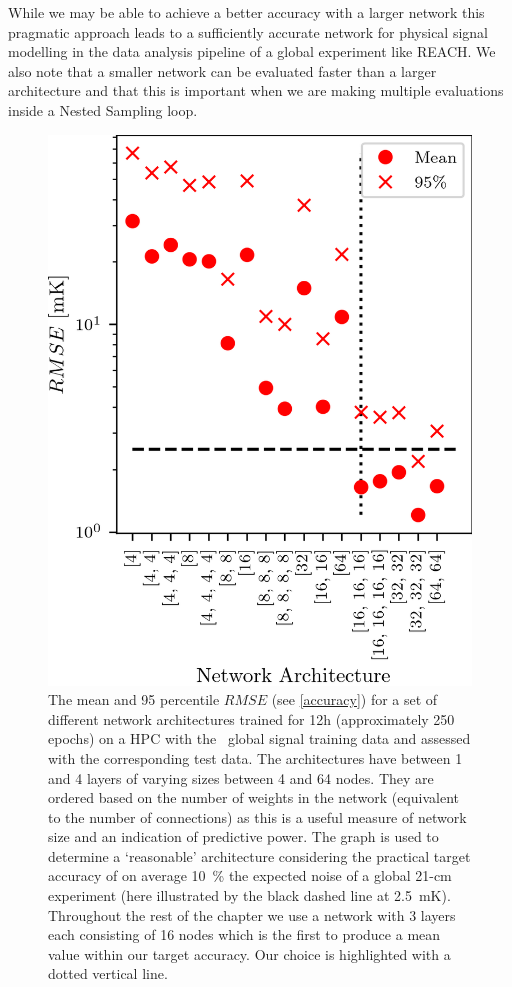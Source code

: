 While we may be able to achieve a better accuracy with a larger network this pragmatic approach leads to a sufficiently accurate network for physical signal modelling in the data analysis pipeline of a global experiment like REACH. We also note that a smaller network can be evaluated faster than a larger architecture and that this is important when we are making multiple evaluations inside a Nested Sampling loop.

\begin{figure}
    \centering
    \includegraphics{globalemu/figs/Architecture.png}
    \caption{The mean and 95 percentile $RMSE$ (see \cref{accuracy}) for a set of different network architectures trained for 12h (approximately 250 epochs) on a HPC with the \cmGEM~global signal training data and assessed with the corresponding test data. The architectures have between 1 and 4 layers of varying sizes between 4 and 64 nodes. They are ordered based on the number of weights in the network (equivalent to the number of connections) as this is a useful measure of network size and an indication of predictive power. The graph is used to determine a `reasonable' architecture considering the practical target accuracy of on average 10~\% the expected noise of a global 21-cm experiment (here illustrated by the black dashed line at 2.5~mK). Throughout the rest of the chapter we use a network with 3 layers each consisting of 16 nodes which is the first to produce a mean value within our target accuracy. Our choice is highlighted with a dotted vertical line.}
    \label{fig:architecture}
\end{figure}

